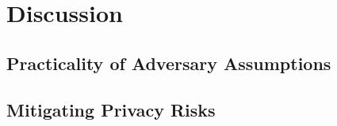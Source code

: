 \section{Discussion}\label{discuss}


\subsection{Practicality of Adversary Assumptions}


\subsection{Mitigating Privacy Risks}
